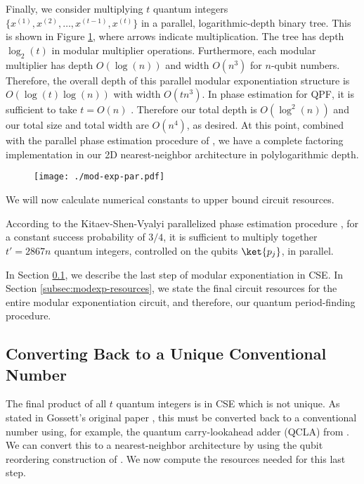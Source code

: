 Finally, we consider multiplying $t$ quantum integers
$\{x^{(1)}, x^{(2)}, \ldots, x^{(t-1)}, x^{(t)}\}$ in a parallel,
logarithmic-depth binary tree.
This is shown in Figure \ref{fig:modexp-qq-parallel}, where arrows indicate multiplication.
The tree has depth $\log_2(t)$ in modular multiplier operations. Furthermore,
each
modular multiplier has depth $O(\log(n))$ and width $O(n^3)$ for $n$-qubit
numbers. Therefore, the overall depth of this parallel modular exponentiation
structure is $O(\log(t)\log(n))$ with width $O(tn^3)$.
In phase estimation for QPF, it is
sufficient to take $t = O(n)$ \cite{Nielsen2000,Kitaev2002}. Therefore our total depth is
$O(\log^2(n))$ and our total size and total width are $O(n^4)$, as desired. At this point, combined with the parallel phase
estimation procedure of \cite{Kitaev2002}, we have a complete factoring
implementation in our 2D nearest-neighbor architecture in polylogarithmic
depth.
%
\begin{figure*}[tb!]
\centerline{
\texttt{[image: ./mod-exp-par.pdf]}
}
\label{fig:modexp-qq-parallel}
\end{figure*}

We will now calculate numerical
constants to upper bound circuit resources.

According to the Kitaev-Shen-Vyalyi parallelized phase estimation procedure
\cite{Kitaev2002},
for a constant success probability of $3/4$,
it is sufficient to multiply together $t' = 2867n$ quantum integers,
controlled on the qubits $\ket{p_j}$, in parallel.

In Section \ref{subsec:qcla}, we describe the last step of modular
exponentiation in CSE. In Section \ref{subsec:modexp-resources}, we
state the final circuit resources for the entire modular exponentiation
circuit,
and therefore, our quantum period-finding procedure.

\subsection{Converting Back to a Unique Conventional Number}
\label{subsec:qcla}

The final product of all $t$ quantum integers is in CSE which is not
unique. As stated in Gossett's original paper \cite{Gossett1998}, this
must be converted back to a conventional number using, for example, the
quantum carry-lookahead adder (QCLA) from \cite{Draper2004}. We can convert
this to a nearest-neighbor architecture by using the qubit reordering
construction of \cite{Rosenbaum2012}. We now compute the resources
needed for this last step.

